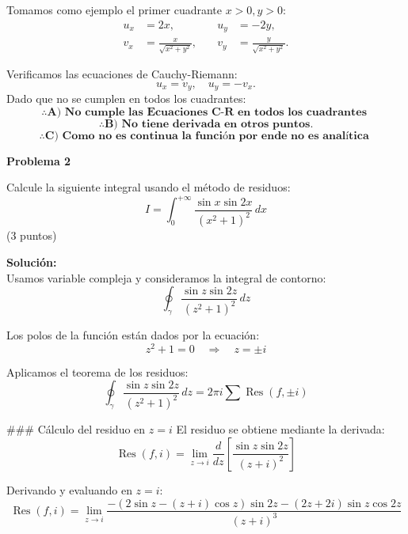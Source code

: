 \documentclass[a4paper,12pt]{article}
\begin{document}
Tomamos como ejemplo el primer cuadrante \( x > 0, y > 0 \):
\[
\begin{aligned}
    u_x &= 2x, \quad & u_y &= -2y, \\
    v_x &= \frac{x}{\sqrt{x^2 + y^2}}, \quad & v_y &= \frac{y}{\sqrt{x^2 + y^2}}.
\end{aligned}
\]

Verificamos las ecuaciones de Cauchy-Riemann:
\[
u_x = v_y, \quad u_y = -v_x.
\]
Dado que no se cumplen en todos los cuadrantes:
\[
\therefore \textbf{A) No cumple las Ecuaciones C-R en todos los cuadrantes }
\]
\[
\therefore \textbf{B) No tiene derivada en otros puntos.}
\]
\[
\therefore \textbf{C) Como no es continua la función por ende no es analítica }
\]

{\bf Problema 2}

Calcule la siguiente integral usando el método de residuos:
\begin{equation}
    I = \int_{0}^{+\infty} \frac{\sin x \sin 2x}{(x^2+1)^2} \,dx   \nonumber
\end{equation}
(3 puntos)

{\bf Solución:}\\
Usamos variable compleja y consideramos la integral de contorno:
\begin{equation}
    \oint_{\gamma} \frac{\sin z \sin 2z}{(z^2+1)^2} \,dz  \nonumber
\end{equation}

Los polos de la función están dados por la ecuación:
\begin{equation}
    z^2 + 1 = 0 \quad \Rightarrow \quad z = \pm i    \nonumber
\end{equation}

Aplicamos el teorema de los residuos:
\begin{equation}
    \oint_{\gamma} \frac{\sin z \sin 2z}{(z^2+1)^2} \,dz = 2\pi i \sum \operatorname{Res}(f, \pm i)  \nonumber
\end{equation}

### Cálculo del residuo en $z = i$
El residuo se obtiene mediante la derivada:
\begin{equation}
    \operatorname{Res}(f, i) = \lim_{z \to i} \frac{d}{dz} \left[ \frac{\sin z \sin 2z}{(z+i)^2} \right]  \nonumber
\end{equation}

Derivando y evaluando en $z = i$:
\begin{equation}
    \operatorname{Res}(f, i) = \lim_{z \to i} \frac{-\left( 2 \sin z - (z+i) \cos z \right) \sin 2z - (2z+2i) \sin z \cos 2z}{(z+i)^3}  \nonumber
\end{equation}
\end{document}
